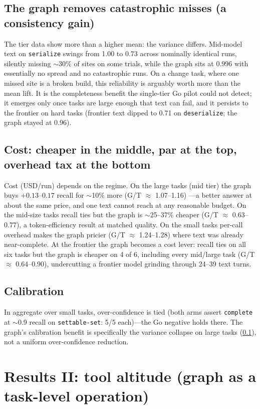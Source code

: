 \documentclass[11pt]{article}
\newcommand{\code}[1]{\texttt{#1}}
\begin{document}
\subsection{The graph removes catastrophic misses (a consistency gain)}
\label{sec:consistency}
The tier data show more than a higher mean: the variance differs. Mid-model
text on \code{serialize} swings from 1.00 to 0.73 across nominally identical
runs, silently missing $\sim$30\% of sites on some trials, while the graph sits
at $0.996$ with essentially no spread and no catastrophic runs. On a change
task, where one missed site is a broken build, this reliability is arguably
worth more than the mean lift. It is the completeness benefit the single-tier
Go pilot could not detect; it emerges only once tasks are large
enough that text can fail, and it persists to the frontier on hard tasks
(frontier text dipped to 0.71 on \code{deserialize}; the graph stayed at 0.96).

\subsection{Cost: cheaper in the middle, par at the top, overhead tax at the bottom}
\label{sec:cost}
Cost (USD/run) depends on the regime. On the large tasks (mid tier) the
graph buys $+0.13$--$0.17$ recall for $\sim$10\% more (G/T $\approx$ 1.07--1.16)
---a better answer at about the same price, and one text cannot reach at
any reasonable budget. On the mid-size tasks recall ties but the
graph is $\sim$25--37\% cheaper (G/T $\approx$ 0.63--0.77), a
token-efficiency result at matched quality. On the small tasks per-call
overhead makes the graph pricier (G/T $\approx$ 1.24--1.28) where text was already
near-complete. At the frontier the graph becomes a cost lever: recall
ties on all six tasks but the graph is cheaper on 4 of 6, including every mid/large
task (G/T $\approx$ 0.64--0.90), undercutting a frontier model grinding through
24--39 text turns.

\subsection{Calibration}
In aggregate over small tasks, over-confidence is tied (both arms assert
\code{complete} at $\sim$0.9 recall on \code{settable-set}: 5/5 each)---the Go
negative holds there. The graph's calibration benefit is specifically the variance
collapse on large tasks (\cref{sec:consistency}), not a uniform over-confidence
reduction.

\section{Results II: tool altitude (graph as a task-level operation)}
\label{sec:altitude}
\end{document}
